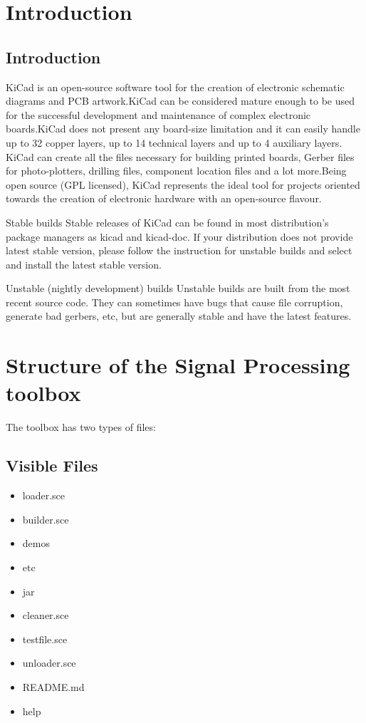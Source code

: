 \documentclass[12pt,a4paper]{report}
\begin{document}
\tableofcontents

\chapter{\textbf{Introduction}}
\section{Introduction}
KiCad is an open-source software tool for the creation of electronic schematic diagrams and PCB artwork.KiCad can be considered mature enough to be used for the successful development and maintenance of complex electronic boards.KiCad does not present any board-size limitation and it can easily handle up to 32 copper layers, up to 14 technical layers and up to 4 auxiliary layers. KiCad can create all the files necessary for building printed boards, Gerber files for photo-plotters, drilling files, component location files and a lot more.Being open source (GPL licensed), KiCad represents the ideal tool for projects oriented towards the creation of electronic hardware with an open-source flavour.

Stable builds
Stable releases of KiCad can be found in most distribution’s package managers as kicad and kicad-doc. If your distribution does not provide latest stable version, please follow the instruction for unstable builds and select and install the latest stable version.

Unstable (nightly development) builds
Unstable builds are built from the most recent source code. They can
sometimes have bugs that cause file corruption, generate bad gerbers, etc, but are generally stable and have the latest  features.

\chapter{\textbf{Structure of the Signal Processing toolbox}}
The toolbox has two types of files:
\section{Visible Files}
\begin{itemize}
\item loader.sce
\item builder.sce
\item demos
\item etc
\item jar
\item cleaner.sce
\item testfile.sce
\item unloader.sce
\item README.md
\item help
\end{itemize}
\end{document}
